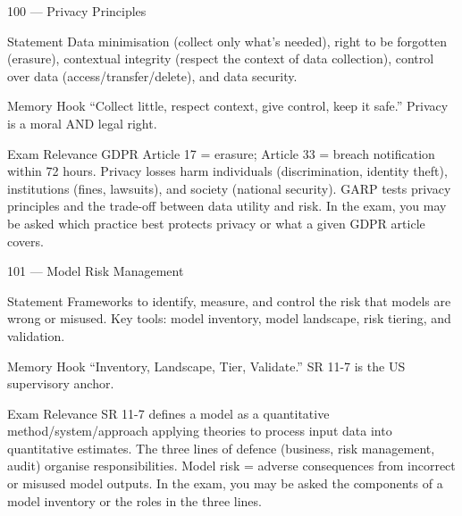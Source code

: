 \documentclass[aspectratio=169,8pt]{beamer}
\begin{document}
	\begin{frame}{100 --- Privacy Principles}
		\begin{block}{Statement}
			Data minimisation (collect only what's needed), right to be forgotten (erasure), contextual integrity (respect the context of data collection), control over data (access/transfer/delete), and data security.
		\end{block}
		\begin{block}{Memory Hook}
			``Collect little, respect context, give control, keep it safe.'' Privacy is a moral AND legal right.
		\end{block}
		\begin{block}{Exam Relevance}
			GDPR Article 17 = erasure; Article 33 = breach notification within 72 hours. Privacy losses harm individuals (discrimination, identity theft), institutions (fines, lawsuits), and society (national security). GARP tests privacy principles and the trade-off between data utility and risk. In the exam, you may be asked which practice best protects privacy or what a given GDPR article covers.
		\end{block}
	\end{frame}
	
	\begin{frame}{101 --- Model Risk Management}
		\begin{block}{Statement}
			Frameworks to identify, measure, and control the risk that models are wrong or misused. Key tools: model inventory, model landscape, risk tiering, and validation.
		\end{block}
		\begin{block}{Memory Hook}
			``Inventory, Landscape, Tier, Validate.'' SR 11-7 is the US supervisory anchor.
		\end{block}
		\begin{block}{Exam Relevance}
			SR 11-7 defines a model as a quantitative method/system/approach applying theories to process input data into quantitative estimates. The three lines of defence (business, risk management, audit) organise responsibilities. Model risk = adverse consequences from incorrect or misused model outputs. In the exam, you may be asked the components of a model inventory or the roles in the three lines.
		\end{block}
	\end{frame}
	
\end{document}
